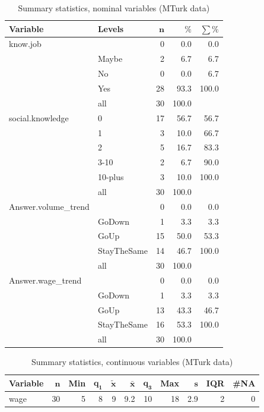 \documentclass[a4paper,10pt]{article}\usepackage[]{graphicx}\usepackage[]{color}
\begin{document}
\begin{table}[ht]
\centering
{\footnotesize
\begin{tabular}{ll|rrr}
 \textbf{Variable} & \textbf{Levels} & $\mathbf{n}$ & $\mathbf{\%}$ & $\mathbf{\sum \%}$ \\ 
  \hline
know.job &  & 0 & 0.0 & 0.0 \\ 
   & Maybe & 2 & 6.7 & 6.7 \\ 
   & No & 0 & 0.0 & 6.7 \\ 
   & Yes & 28 & 93.3 & 100.0 \\ 
   \hline
 & all & 30 & 100.0 &  \\ 
   \hline
\hline
social.knowledge & 0 & 17 & 56.7 & 56.7 \\ 
   & 1 & 3 & 10.0 & 66.7 \\ 
   & 2 & 5 & 16.7 & 83.3 \\ 
   & 3-10 & 2 & 6.7 & 90.0 \\ 
   & 10-plus & 3 & 10.0 & 100.0 \\ 
   \hline
 & all & 30 & 100.0 &  \\ 
   \hline
\hline
Answer.volume\_trend &  & 0 & 0.0 & 0.0 \\ 
   & GoDown & 1 & 3.3 & 3.3 \\ 
   & GoUp & 15 & 50.0 & 53.3 \\ 
   & StayTheSame & 14 & 46.7 & 100.0 \\ 
   \hline
 & all & 30 & 100.0 &  \\ 
   \hline
\hline
Answer.wage\_trend &  & 0 & 0.0 & 0.0 \\ 
   & GoDown & 1 & 3.3 & 3.3 \\ 
   & GoUp & 13 & 43.3 & 46.7 \\ 
   & StayTheSame & 16 & 53.3 & 100.0 \\ 
   \hline
 & all & 30 & 100.0 &  \\ 
   \hline
\hline
\end{tabular}
}
\caption{Summary statistics, nominal variables (MTurk data)} 
\label{tab1:35-2020}
\end{table}
\begin{table}[ht]
\centering
{\footnotesize
\begin{tabular}{lrrrrrrrrrr}
 \textbf{Variable} & $\mathbf{n}$ & \textbf{Min} & $\mathbf{q_1}$ & $\mathbf{\widetilde{x}}$ & $\mathbf{\bar{x}}$ & $\mathbf{q_3}$ & \textbf{Max} & $\mathbf{s}$ & \textbf{IQR} & \textbf{\#NA} \\ 
  \hline
wage & 30 & 5 & 8 & 9 & 9.2 & 10 & 18 & 2.9 & 2 & 0 \\ 
  \end{tabular}
}
\caption{Summary statistics, continuous variables (MTurk data)} 
\label{tab2:35-2020}
\end{table}
\end{document}
